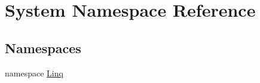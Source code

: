 \hypertarget{namespaceSystem}{}\section{System Namespace Reference}
\label{namespaceSystem}
\subsection*{Namespaces}
\begin{DoxyCompactItemize}
\item 
namespace \hyperlink{namespaceSystem_1_1Linq}{Linq}
\end{DoxyCompactItemize}
